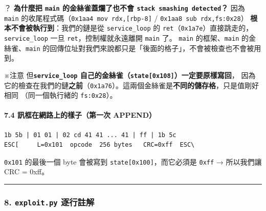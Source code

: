 \documentclass[10pt,a4paper]{article}
\renewenvironment{quote}{%
  \begin{mdframed}[linewidth=0pt,innerleftmargin=0pt,innerrightmargin=0pt,
    innerbottommargin=0pt,innertopmargin=0pt,skipabove=0.55em,skipbelow=0.55em,
    leftmargin=0.9em,rightmargin=0.4em,startcode={\color{quotebar}\vrule width 2.6pt},%
    endcode={}]%
  \itshape\color{black}%
}{%
  \end{mdframed}%
}
\begin{document}
\begin{quote}
？ \textbf{為什麼把 \texttt{main} 的金絲雀蓋爛了也不會
\texttt{stack\ \allowbreak{}smashing\ \allowbreak{}detected}？} 因為 \texttt{main}
的收尾程式碼（\texttt{0x1aa4\ \allowbreak{}mov\ \allowbreak{}rdx,{[}rbp-\allowbreak{}8{]}} /
\texttt{0x1aa8\ \allowbreak{}sub\ \allowbreak{}rdx,\allowbreak{}fs:\allowbreak{}0x28}）
\textbf{根本不會被執行到}：我們的鏈是從 \texttt{service\_\allowbreak{}loop} 的
\texttt{ret}（\texttt{0x1a7e}）直接跳走的， \texttt{service\_\allowbreak{}loop} 一旦
\texttt{ret}，控制權就永遠離開 \texttt{main} 了。 \texttt{main}
的框架、\texttt{main} 的金絲雀、\texttt{main}
的回傳位址對我們來說都只是「後面的格子」，不會被檢查也不會被用到。

※注意 但\textbf{\texttt{service\_\allowbreak{}loop}
自己的金絲雀（\texttt{state{[}0x108{]}}）一定要原樣寫回}，
因為它的檢查在我們的鏈\textbf{之前}（\texttt{0x1a76}）。這兩個金絲雀是\textbf{不同的儲存格}，只是值剛好相同
（同一個執行緒的 \texttt{fs:\allowbreak{}0x28}）。
\end{quote}

\paragraph{7.4 訊框在網路上的樣子（第一次
APPEND）}\label{ux8a0aux6846ux5728ux7db2ux8defux4e0aux7684ux6a23ux5b50ux7b2cux4e00ux6b21-append}

\begin{Verbatim}[breaklines=true,breakanywhere=true,breakautoindent=false,fontsize=\fontsize{7.0}{9.5}\selectfont]
1b 5b | 01 01 | 02 cd 41 41 ... 41 | ff | 1b 5c
ESC[     L=0x101  opcode  256 bytes   CRC=0xff  ESC\
\end{Verbatim}

\texttt{0x101} 的最後一個 byte 會被寫到
\texttt{state{[}0x100{]}}，而它必須是 \texttt{0xff} → 所以我們讓 CRC =
0xff。

\begin{center}\rule{0.5\linewidth}{0.5pt}\end{center}

\subsubsection{\texorpdfstring{8. \texttt{exploit.\allowbreak{}py}
逐行註解}{8. exploit.py 逐行註解}}\label{exploit.py-ux9010ux884cux8a3bux89e3-1}
\end{document}
